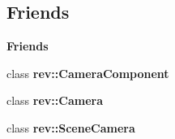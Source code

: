 \subsection*{Friends}
\begin{Indent}\textbf{ Friends}\par
\begin{DoxyCompactItemize}
\item 
\mbox{\label{classrev_1_1_render_projection_a5ff702a2ca6b4d1a3624203c5b629772}} 
class {\bfseries rev\+::\+Camera\+Component}
\item 
\mbox{\label{classrev_1_1_render_projection_af887e39085d8bbe0af032e498a88dafa}} 
class {\bfseries rev\+::\+Camera}
\item 
\mbox{\label{classrev_1_1_render_projection_a3e09c238a60d5d7e90ed6fbf7b776260}} 
class {\bfseries rev\+::\+Scene\+Camera}
\end{DoxyCompactItemize}
\end{Indent}
